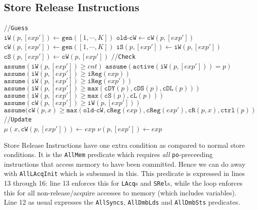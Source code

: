 \documentclass{article}
\newcommand{\var}{\texttt}
\begin{document}
\subsection{Store Release Instructions}
\begin{algorithm}[H]
  \SetAlgoLined
  //\var{Guess}\\
  $\var{iW}(p,[exp']) \gets \var{gen}([1,\cdots,K])$\;
  $\var{old-cW} \gets \var{cW}(p,[exp'])$\;
  $\var{cW}(p,[exp']) \gets \var{gen}([1,\cdots,K])$\;
  $\var{iS}(p,[exp']) \gets \var{iW}(p,[exp'])$\;
  $\var{cS}(p,[exp']) \gets \var{cW}(p,[exp'])$\;
  //\var{Check}\\
  $\var{assume}(\var{iW}(p,[exp']) \geq cnt)$\;
  $\var{assume}(\var{active}(\var{iW}(p,[exp'])) = p)$\;
  $\var{assume}(\var{iW}(p,[exp']) \geq \var{iReg}(exp))$\;
  $\var{assume}(\var{iW}(p,[exp']) \geq \var{iReg}(exp'))$\;
  $\var{assume}(\var{iW}(p,[exp']) \geq \var{max}(\var{cDY}(p),\var{cDS}(p),\var{cDL}(p)))$\;
  $\var{assume}(\var{iW}(p,[exp']) \geq \var{max}(\var{cS}(p),\var{cL}(p)))$\;
  \For{$x \in \mathcal{X}$}{
    $\var{assume}(\var{iW}(p,[exp']) \geq \var{max}(\var{cR}(p,x),\var{cW}(p,x)))$\;
  }
  $\var{assume}(\var{cW}(p,[exp']) \geq \var{iW}(p,[exp']))$\;
  $\var{assume}(\var{cW}(p,x) \geq \var{max}(\var{old-cW},\var{cReg}(exp),\var{cReg}(exp'),\var{cR}(p,x),\var{ctrl}(p))$\;
  //\var{Update}\\
  $\mu(x,\var{cW}(p,[exp'])) \gets exp$\;
  $\nu(p,[exp']) \gets exp$\;
  \caption{$\llbracket [exp'] \leftarrow exp\rrbracket_K^{p,\var{SRel}}$}
\end{algorithm}
Store Release Instructions have one extra condition as compared to normal store conditions. It is the \var{AllMem} predicate which requires \textit{all} \var{po}-preceeding instructions that access memory to have been committed. Hence we can do away with \var{AllLAcqInit} which is subsumed in this. This predicate is expressed in lines 13 through 16: line 13 enforces this for \var{LAcq}s and \var{SRel}s, while the loop enforces this for all non-release/acquire accesses to memory (which includes variables). Line 12 as usual expresses the \var{AllSyncs}, \var{AllDmbLds} and \var{AllDmbSts} predicates. 
\end{document}
